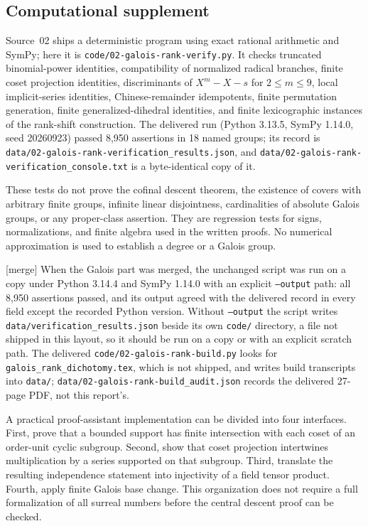 \documentclass[11pt,letterpaper]{article}
\theoremstyle{definition}
\theoremstyle{remark}
\begin{document}
\subsection{Computational supplement}\label{bst:gr:subsec:verification}

Source~02 ships a deterministic program using exact rational arithmetic and
SymPy; here it is \nolinkurl{code/02-galois-rank-verify.py}. It checks truncated
binomial-power identities, compatibility of normalized radical branches,
finite coset projection identities, discriminants of $X^m-X-s$ for
$2\le m\le9$, local implicit-series identities, Chinese-remainder
idempotents, finite permutation generation, finite generalized-dihedral
identities, and finite lexicographic instances of the rank-shift
construction. The delivered run (Python 3.13.5, SymPy 1.14.0, seed
20260923) passed 8,950 assertions in 18 named groups; its record is
\texttt{data/02-galois-rank-verification\_results.json}, and
\texttt{data/02-galois-rank-verification\_console.txt} is a byte-identical
copy of it.

These tests do not prove the cofinal descent theorem, the existence of
covers with arbitrary finite groups, infinite linear disjointness,
cardinalities of absolute Galois groups, or any proper-class assertion. They
are regression tests for signs, normalizations, and finite algebra used in
the written proofs. No numerical approximation is used to establish a degree
or a Galois group.

\textup{[merge]} When the Galois part was merged, the unchanged script was
run on a copy under Python 3.14.4 and SymPy 1.14.0 with an explicit
\texttt{--output} path: all 8,950 assertions passed, and its output agreed
with the delivered record in every field except the recorded Python version.
Without \texttt{--output} the script writes
\texttt{data/verification\_results.json} beside its own \texttt{code/}
directory, a file not shipped in this layout, so it should be run on a copy
or with an explicit scratch path. The delivered
\texttt{code/02-galois-rank-build.py} looks for
\texttt{galois\_rank\_dichotomy.tex}, which is not shipped, and writes build
transcripts into \texttt{data/}; \texttt{data/02-galois-rank-build\_audit.json}
records the delivered 27-page PDF, not this report's.

A practical proof-assistant implementation can be divided into four
interfaces. First, prove that a bounded support has finite intersection with
each coset of an order-unit cyclic subgroup. Second, show that coset
projection intertwines multiplication by a series supported on that
subgroup. Third, translate the resulting independence statement into
injectivity of a field tensor product. Fourth, apply finite Galois base
change. This organization does not require a full formalization of all
surreal numbers before the central descent proof can be checked.
\end{document}
